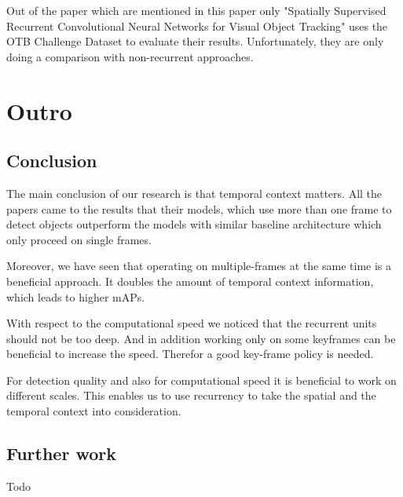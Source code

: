 \documentclass[conference]{IEEEtran}
\begin{document}
Out of the paper which are mentioned in this paper only "Spatially Supervised Recurrent Convolutional Neural Networks for Visual Object Tracking" uses the OTB Challenge Dataset to evaluate their results. Unfortunately, they are only doing a comparison with non-recurrent approaches. 

\section{Outro}

\subsection{Conclusion}
The main conclusion of our research is that temporal context matters. All the papers came to the results that their models, which use more than one frame to detect objects outperform the models with similar baseline architecture which only proceed on single frames. \newline

Moreover, we have seen that operating on multiple-frames at the same time is a beneficial approach. It doubles the amount of temporal context information, which leads to higher mAPs. \newline

With respect to the computational speed we noticed that the recurrent units should not be too deep. And in addition working only on some keyframes can be beneficial to increase the speed. Therefor a good key-frame policy is needed. \newline

For detection quality and also for computational speed it is beneficial to work on different scales. This enables us to use recurrency to take the spatial and the temporal context into consideration. 

\subsection{Further work}
Todo
\end{document}
